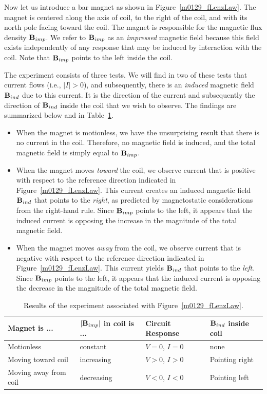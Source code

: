 Now let us introduce a bar magnet as shown in Figure~\ref{m0129_fLenzLaw}.
The magnet is centered along the axis of coil, to the right of the coil, and with its north pole facing toward the coil.
The magnet is responsible for the magnetic flux density ${\bf B}_{imp}$.
We refer to ${\bf B}_{imp}$ as an \emph{impressed} magnetic field because this field exists independently of any response that may be induced by interaction with the coil.
Note that ${\bf B}_{imp}$ points to the left inside the coil.

The experiment consists of three tests.
We will find in two of these tests that current flows (i.e., $\left|I\right|>0$), and subsequently, there is an \emph{induced} magnetic field ${\bf B}_{ind}$ due to this current.
It is the direction of the current and subsequently the direction of ${\bf B}_{ind}$ inside the coil that we wish to observe.
The findings are summarized below and in Table~\ref{m0129_tLenzLaw}.
%
\begin{itemize}
\item When the magnet is motionless, we have the unsurprising result that there is no current in the coil. Therefore, no magnetic field is induced, and the total magnetic field is simply equal to ${\bf B}_{imp}$.
\item When the magnet moves \emph{toward} the coil, we observe current that is positive with respect to the reference direction indicated in Figure~\ref{m0129_fLenzLaw}.  This current creates an induced magnetic field ${\bf B}_{ind}$ that points to the \emph{right}, as predicted by magnetostatic considerations from the right-hand rule. Since ${\bf B}_{imp}$ points to the left, it appears that the induced current is opposing the increase in the magnitude of the total magnetic field. 
\item When the magnet moves \emph{away} from the coil, we observe current that is negative with respect to the reference direction indicated in Figure~\ref{m0129_fLenzLaw}.  This current yields ${\bf B}_{ind}$ that points to the \emph{left}. Since ${\bf B}_{imp}$ points to the left, it appears that the induced current is opposing the decrease in the magnitude of the total magnetic field.
\end{itemize}
%
\begin{table}
\begin{center}
\begin{tabular}{llll}
Magnet is ... & $\left|{\bf B}_{imp}\right|$ in coil is ... & Circuit Response & ${\bf B}_{ind}$ inside coil \\
\hline
Motionless & constant & $V=0$, $I=0$ & none \\
Moving toward coil & increasing & $V>0$, $I>0$ & Pointing right \\
Moving away from coil & decreasing & $V<0$, $I<0$ & Pointing left \\
\end{tabular}
\end{center}
\caption{\label{m0129_tLenzLaw}Results of the experiment associated with Figure~\ref{m0129_fLenzLaw}.}
\end{table}

